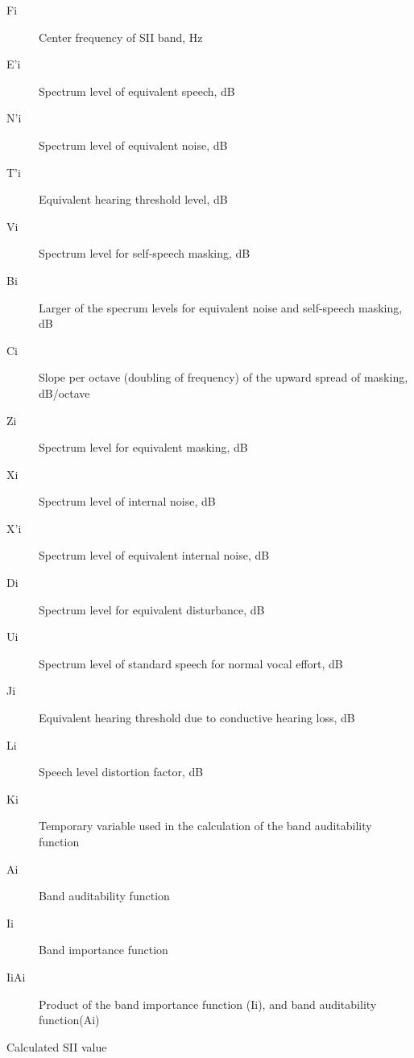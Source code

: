 \documentclass[letterpaper]{book}
\begin{document}
\begin{Value}
\begin{ldescription}
\begin{description}
\item[Fi] Center frequency of SII band, Hz
\item[E'i] Spectrum level of equivalent speech, dB
\item[N'i] Spectrum level of equivalent noise, dB
\item[T'i] Equivalent hearing threshold level, dB
\item[Vi] Spectrum level for self-speech masking, dB
\item[Bi] Larger of the specrum levels for equivalent noise and
self-speech masking, dB
\item[Ci] Slope per octave (doubling of frequency) of the upward
spread of masking, dB/octave
\item[Zi] Spectrum level for equivalent masking, dB
\item[Xi] Spectrum level of internal noise, dB
\item[X'i] Spectrum level of equivalent internal noise, dB
\item[Di] Spectrum level for equivalent disturbance, dB
\item[Ui] Spectrum level of standard speech for normal vocal
effort, dB
\item[Ji] Equivalent hearing threshold due to conductive hearing
loss, dB
\item[Li] Speech level distortion factor, dB
\item[Ki] Temporary variable used in the calculation of the band
auditability function
\item[Ai] Band auditability function
\item[Ii] Band importance function
\item[IiAi] Product of the band importance function (Ii), and band
auditability function(Ai)

\end{description}


\item[\code{sii}] Calculated SII value
\end{ldescription}
\end{Value}
%
\end{document}
